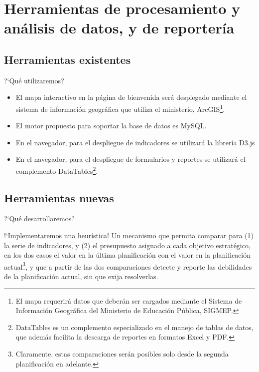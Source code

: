 \documentclass[xcolor=table, aspectratio=169]{beamer}
\begin{document}
\section{Herramientas de procesamiento y an\'alisis de datos, y de reporter\'ia}

\subsection{Herramientas existentes}

\begin{frame}[t]{?`Qu\'e utilizaremos?}
	\begin{itemize}
		\item El mapa interactivo en la p\'agina de bienvenida ser\'a desplegado mediante el sistema de informaci\'on geogr\'afica que utiliza el ministerio, ArcGIS\footnote{El mapa requerir\'a datos que deber\'an ser cargados mediante el Sistema de Informaci\'on Geogr\'afica del Ministerio de Educaci\'on P\'ublica, SIGMEP.}.
		\item El motor propuesto para soportar la base de datos es MySQL.
		\item En el navegador, para el despliegue de indicadores se utilizar\'a la librer\'ia D3.js
		\item En el navegador, para el despliegue de formularios y reportes se utilizar\'a el complemento DataTables\footnote{DataTables es un complemento especializado en el manejo de tablas de datos, que adem\'as facilita la descarga de reportes en formatos Excel y PDF.}.
	\end{itemize}
\end{frame}

\subsection{Herramientas nuevas}

\begin{frame}[t]{?`Qu\'e desarrollaremos?}
	\begin{block}{!`Implementaremos una heur\'istica!}
		Un mecanismo que permita comparar para (1) la serie de indicadores, y (2) el presupuesto asignado a cada objetivo estrat\'egico, en los dos casos el valor en la \'ultima planificaci\'on con el valor en la planificaci\'on actual\footnote{Claramente, estas comparaciones ser\'an posibles solo desde la segunda planificaci\'on en adelante.}, y que a partir de las dos comparaciones detecte y reporte las debilidades de la planificaci\'on actual, sin que exija resolverlas.
	\end{block}
\end{frame}
\end{document}
